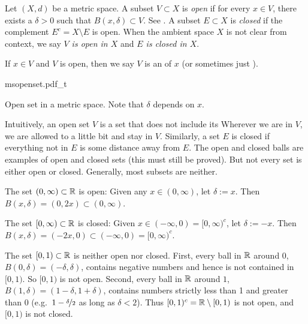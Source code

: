 \begin{defn}
Let $(X,d)$ be a metric space.  A subset $V \subset X$
is \emph{open}
if for every $x \in V$, there exists a $\delta > 0$ such that
$B(x,\delta) \subset V$.  See .  A subset $E \subset X$ is 
\emph{closed} if the complement $E^c = X \setminus E$ is open.
When the ambient space $X$ is not clear from context,
we say \emph{$V$ is open in $X$} and \emph{$E$ is closed in $X$}.

If $x \in V$ and $V$ is open, then we say 
$V$ is an \emph{} of $x$ (or
sometimes just \emph{}).
\end{defn}

\begin{myfigureht}
{msopenset.pdf_t}
\caption{Open set in a metric space.  Note that $\delta$ depends on $x$.\label{fig:msopenset}}
\end{myfigureht}

Intuitively, an open set $V$ is a set that does not include its
Wherever we are in $V$,
we are allowed to  a little bit and
stay in $V$.  Similarly, a set $E$ is closed if everything not in $E$
is some distance away from $E$.
The open and closed balls are examples of open and closed sets
(this must still be proved).
But not every set is either open or closed.  Generally, most subsets are neither.

\begin{example}
The set $(0,\infty) \subset {\mathbb{R}}$ is open:  Given any $x \in (0,\infty)$,
let $\delta := x$.  Then $B(x,\delta) = (0,2x) \subset (0,\infty)$.

The set $[0,\infty) \subset {\mathbb{R}}$ is closed:  Given $x \in (-\infty,0) =
[0,\infty)^c$,
let $\delta := -x$.  Then $B(x,\delta) = (-2x,0) \subset
(-\infty,0) = [0,\infty)^c$.

The set $[0,1) \subset {\mathbb{R}}$ is neither open nor closed.  First,
every ball in ${\mathbb{R}}$ around $0$, $B(0,\delta) = (-\delta,\delta)$, contains negative
numbers and hence is not contained in $[0,1)$.  So $[0,1)$ is not open.
Second, every ball in ${\mathbb{R}}$ around $1$,
$B(1,\delta) = (1-\delta,1+\delta)$, contains
numbers strictly less than 1 and greater than 0
(e.g.\ $1-\nicefrac{\delta}{2}$ as long as $\delta < 2$).
Thus $[0,1)^c = {\mathbb{R}} \setminus
[0,1)$ is not open, and $[0,1)$ is not closed.
\end{example}

